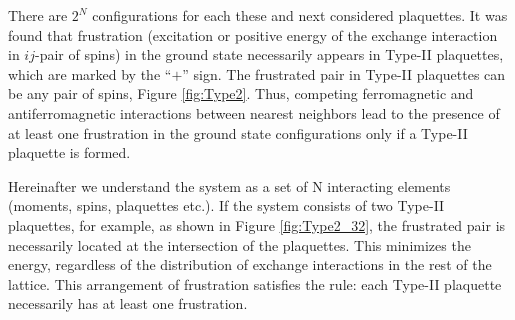 \documentclass[preprint,12pt]{elsarticle}
\begin{document}
	
	There are $2^N$ configurations for each these and next considered plaquettes.
	It was found that frustration (excitation or positive energy of the exchange interaction in $ij$-pair of spins) in the ground state necessarily appears in Type-II plaquettes, which are marked by the ``$+$'' sign. The frustrated pair in Type-II plaquettes can be any pair of spins, Figure \ref{fig:Type2}. Thus, competing ferromagnetic and antiferromagnetic interactions between nearest neighbors lead to the presence of at least one frustration in the ground state configurations only if a Type-II plaquette is formed.
	
	Hereinafter we understand the system as a set of N interacting elements (moments, spins, plaquettes etc.). If the system consists of two Type-II plaquettes, for example, as shown in Figure \ref{fig:Type2_32}, the frustrated pair is necessarily located at the intersection of the plaquettes. This minimizes the energy, regardless of the distribution of exchange interactions in the rest of the lattice. This arrangement of frustration satisfies the rule: each Type-II plaquette necessarily has at least one frustration.
	
\end{document}
